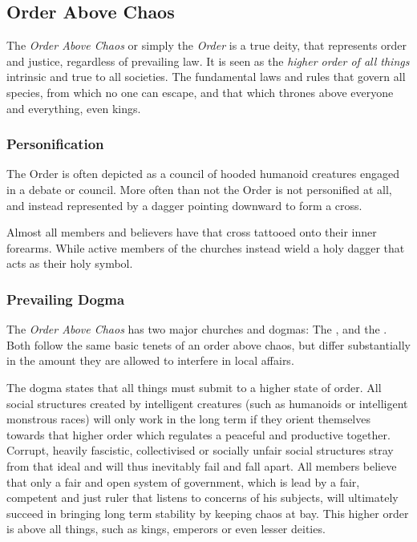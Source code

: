 \subsection{Order Above Chaos}
\label{sec:Order}

The \emph{Order Above Chaos} or simply the \emph{Order} is a true deity, that
represents order and justice, regardless of prevailing law. It is seen as the
\emph{higher order of all things} intrinsic and true to all societies. The
fundamental laws and rules that govern all species, from which no one can
escape, and that which thrones above everyone and everything, even kings.

\subsubsection{Personification}

The Order is often depicted as a council of hooded humanoid creatures engaged
in a debate or council. More often than not the Order is not personified at
all, and instead represented by a dagger pointing downward to form a cross.

Almost all members and believers have that cross tattooed onto their inner
forearms. While active members of the churches instead wield a holy dagger
that acts as their holy symbol.

\subsubsection{Prevailing Dogma}

The \emph{Order Above Chaos} has two major churches and dogmas: The
, and the .
Both follow the same basic tenets of an order above chaos, but differ
substantially in the amount they are allowed to interfere in local affairs.

The dogma states that all things must submit to a higher state of order. All
social structures created by intelligent creatures (such as humanoids or
intelligent monstrous races) will only work in the long term if they orient
themselves towards that higher order which regulates a peaceful and productive
together. Corrupt, heavily fascistic, collectivised or socially unfair social
structures stray from that ideal and will thus inevitably fail and fall
apart. All members believe that only a fair and open system of government, which
is lead by a fair, competent and just ruler that listens to concerns of his
subjects, will ultimately succeed in bringing long term stability by keeping
chaos at bay. This higher order is above all things, such as kings, emperors
or even lesser deities.

